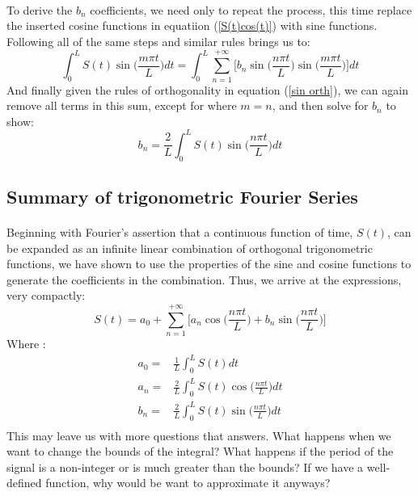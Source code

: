 \documentclass[12pt,letterpaper]{article}
\begin{document}
\paragraph*{}To derive the $b_n$ coefficients, we need only to repeat the process, this time replace the inserted cosine functions in equatiion (\ref{S(t)cos(t)}) with sine functions. Following all of the same steps and similar rules brings us to:
\begin{equation}
\int_{0}^{L}S(t)\sin\Big(\frac{m\pi t}{L}\Big)dt = 
\int_{0}^{L}\sum_{n=1}^{+\infty} \Bigg[ b_n \sin\Big(\frac{n\pi t}{L}\Big)\sin\Big(\frac{m\pi t}{L}\Big) \Bigg]dt
\end{equation}And finally given the rules of orthogonality in equation (\ref{sin orth}), we can again remove all terms in this sum, except for where $m = n$, and then solve for $b_n$ to show:
\begin{equation}
\label{b_n}
b_n = \frac{2}{L}\int_{0}^{L}S(t)\sin\Big(\frac{n\pi t}{L}\Big)dt
\end{equation}


\subsection*{Summary of trigonometric Fourier Series}
\paragraph*{}Beginning with Fourier's assertion that a continuous function of time, $S(t)$, can be expanded as an infinite linear combination of orthogonal trigonometric functions, we have shown to use the properties of the sine and cosine functions to generate the coefficients in the combination. Thus, we arrive at the expressions, very compactly:
\begin{equation}
S(t) = a_0 + \sum_{n=1}^{+\infty} \Bigg[ a_n \cos\Big(\frac{n\pi t}{L}\Big) + b_n \sin\Big(\frac{n\pi t}{L}\Big) \Bigg]
\end{equation}
Where \cite{Pinsky,Tolstov,Peatross}:
\begin{equation}
\begin{split}
a_0 =& \frac{1}{L}\int_{0}^{L}S(t)dt \\
a_n =& \frac{2}{L}\int_{0}^{L}S(t)\cos\Big(\frac{n\pi t}{L}\Big)dt \\
b_n =& \frac{2}{L}\int_{0}^{L}S(t)\sin\Big(\frac{n\pi t}{L}\Big)dt \\
\end{split}
\end{equation}
This may leave us with more questions that answers. What happens when we want to change the bounds of the integral? What happens if the period of the signal is a non-integer or is much greater than the bounds? If we have a well-defined function, why would be want to approximate it anyways?
\end{document}
